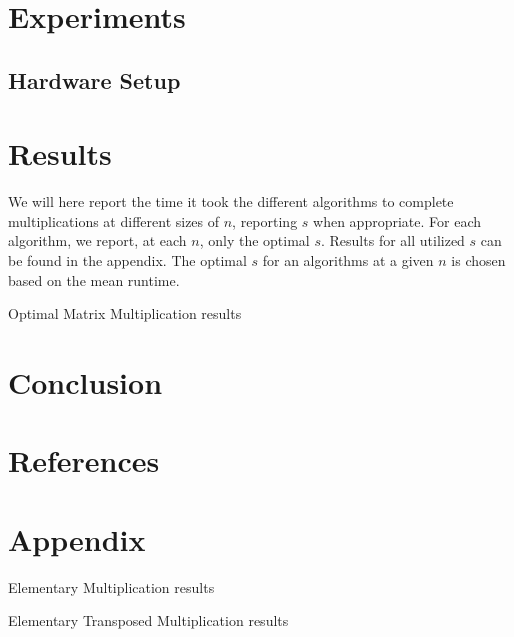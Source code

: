 \documentclass[12pt, a4paper]{article}
\begin{document}
\section{Experiments}

\subsection{Hardware Setup}


\section{Results}
We will here report the time it took the different algorithms to complete multiplications at different sizes of $n$, reporting $s$ when appropriate. For each algorithm, we report, at each $n$, only the optimal $s$. Results for all utilized $s$ can be found in the appendix. The optimal $s$ for an algorithms at a given $n$ is chosen based on the mean runtime.

\begin{table}[p]
\begin{center}
\label{tbl:horse_optimal}

\caption{Optimal Matrix Multiplication results}
\end{center}
\end{table}


\section{Conclusion}

\section{References}

\section{Appendix}

\begin{table}[p]
\begin{center}
\label{tbl:horse_ele}

\caption{Elementary Multiplication results}
\end{center}
\end{table}

\begin{table}[p]
\begin{center}
\label{tbl:horse_trans}

\caption{Elementary Transposed Multiplication results}
\end{center}
\end{table}
\end{document}
